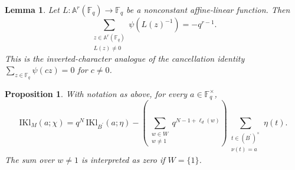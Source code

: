 \documentclass[10pt,a4paper]{amsart}
\newtheorem{lemma}{Lemma}
\newtheorem{proposition}{Proposition}
\newcommand{\IKl}{\mathrm{IKl}}
\begin{document}
\begin{lemma}\label{lem:inverted-affine}
Let \(L\colon\mathbb{A}^r(\mathbb{F}_q)\to\mathbb{F}_q\) be a
nonconstant affine-linear function.  Then
\[
\sum_{\substack{z\in\mathbb{A}^r(\mathbb{F}_q)\\L(z)\neq 0}}
\psi(L(z)^{-1})
=
-q^{r-1}.
\]
This is the inverted-character analogue of the cancellation identity
\(\sum_{z\in\mathbb{F}_q}\psi(cz)=0\) for \(c\neq 0\).
\end{lemma}

\begin{proposition}\label{prop:inverted-master}
With notation as above, for every \(a\in\mathbb{F}_q^\times\),
\begin{equation}\label{eq:inverted-master}
\IKl_M(a;\chi)
=
q^N\, \IKl_{B^{\prime}}(a;\eta)
-
\left(\sum_{\substack{w\in W\\ w\neq 1}} q^{N-1+\ell_d(w)}\right)
\sum_{\substack{t\in (B^{\prime})^\times\\ \nu(t)=a}} \eta(t).
\end{equation}
The sum over \(w\neq 1\) is interpreted as zero if \(W=\{1\}\).
\end{proposition}
\end{document}
